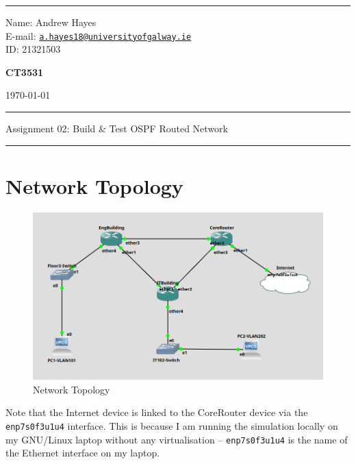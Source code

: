 \documentclass[a4paper]{article}
\begin{document}
\hrule \medskip
\begin{minipage}{0.295\textwidth} 
    \raggedright
    \footnotesize 
    Name: Andrew Hayes \\
    E-mail: \href{mailto://a.hayes18@universityofgalway.ie}{\texttt{a.hayes18@universityofgalway.ie}}  \hfill\\   
    ID: 21321503 \hfill
\end{minipage}
\begin{minipage}{0.4\textwidth} 
    \centering 
    \vspace{0.4em}
    \Large 
    \textbf{CT3531} \\ 
\end{minipage}
\begin{minipage}{0.295\textwidth} 
    \raggedleft
    \today
\end{minipage}
\medskip\hrule 
\begin{center}
    \normalsize
    Assignment 02: Build \& Test OSPF Routed Network 
\end{center}
\hrule

\section{Network Topology}
\begin{figure}[H]
    \centering
    \includegraphics[width=\textwidth]{./images/topology.png}
    \caption{Network Topology}
\end{figure}

Note that the Internet device is linked to the CoreRouter device via the \verb|enp7s0f3u1u4| interface.
This is because I am running the simulation locally on my GNU/Linux laptop without any virtualisation -- \verb|enp7s0f3u1u4| is the name of the Ethernet interface on 
my laptop.
 
\end{document}
